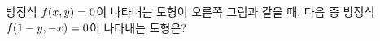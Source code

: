 \noindent\begin{minipage}[t]{0.58\linewidth}\vspace{0pt}\raggedright 방정식 $f(x{,}\mkern3mu\mathopen{}y)=0$이 나타내는 도형이 오른쪽 그림과 같을 때, 다음 중 방정식 $f(1-y{,}\mkern3mu\mathopen{}-x)=0$이 나타내는 도형은?\end{minipage}\hfill\begin{minipage}[t]{0.4\linewidth}\vspace{0pt}\centering \resizebox{\ifdim\width>\linewidth\linewidth\else\width\fi}{!}{}\end{minipage}\par
\begin{choicesii}{}{}{}{}{}\end{choicesii}
